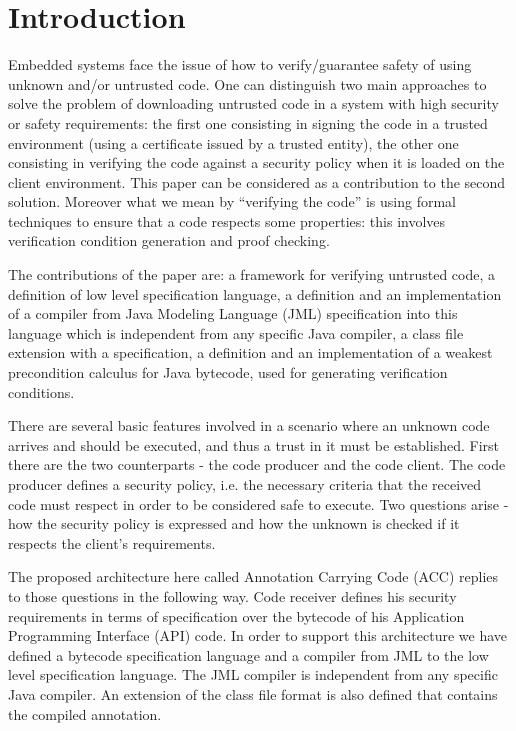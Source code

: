 
\section{Introduction}\label{intro}

Embedded systems face the issue of how to verify/guarantee safety of using unknown and/or untrusted code. One can distinguish two main approaches to solve the problem of downloading untrusted code in a system with high security or safety requirements: the first one consisting in signing the code in a trusted environment (using a certificate issued by a trusted entity), the other one consisting in verifying the code against a security policy when it is loaded on the client environment. This paper can be considered as a contribution to the second solution. Moreover what we mean by ``verifying the code'' is using formal techniques to ensure that a code respects some properties: this involves verification condition generation and proof checking.
 
The contributions of the paper are: a framework for verifying untrusted code, a definition of low level specification language, a definition and an implementation of a compiler from Java Modeling Language (JML)\cite{JMLRefMan} specification into this language which is independent from any specific Java compiler, a class file extension with a specification, a definition and an implementation of a weakest precondition calculus for Java bytecode, used for generating verification conditions. 

There are several basic features involved in a scenario where an unknown code arrives and should be executed, and thus a trust in it must be established. First there are the 
two counterparts - the code producer and the code client. The code producer defines a security policy, i.e. the necessary criteria that the received code must respect in order to be considered safe to execute. Two questions arise - how the security policy is expressed and how the unknown is checked if it respects the client's requirements. 

The proposed architecture here called Annotation Carrying Code (ACC) replies to those questions in the following way. Code receiver defines his security requirements in terms of specification over the bytecode of his Application Programming Interface (API) code. In order to support this architecture we have defined a bytecode specification language and a compiler from JML to the low level specification language. The JML compiler is independent from any specific Java compiler. An extension of the class file format is also defined that contains the compiled annotation.

